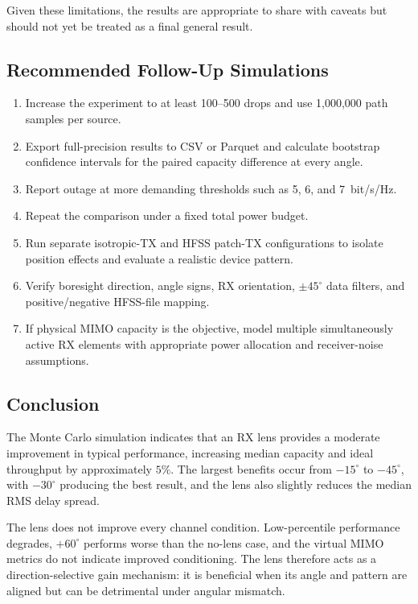 \documentclass[10pt]{article}
\begin{document}
Given these limitations, the results are appropriate to share with caveats
but should not yet be treated as a final general result.

\subsection{Recommended Follow-Up Simulations}

\begin{enumerate}
    \item Increase the experiment to at least 100--500 drops and use
    1,000,000 path samples per source.
    \item Export full-precision results to CSV or Parquet and calculate
    bootstrap confidence intervals for the paired capacity difference at
    every angle.
    \item Report outage at more demanding thresholds such as 5, 6, and
    7~bit/s/Hz.
    \item Repeat the comparison under a fixed total power budget.
    \item Run separate isotropic-TX and HFSS patch-TX configurations to
    isolate position effects and evaluate a realistic device pattern.
    \item Verify boresight direction, angle signs, RX orientation,
    $\pm45^\circ$ data filters, and positive/negative HFSS-file mapping.
    \item If physical MIMO capacity is the objective, model multiple
    simultaneously active RX elements with appropriate power allocation and
    receiver-noise assumptions.
\end{enumerate}

\subsection{Conclusion}

The Monte Carlo simulation indicates that an RX lens provides a moderate
improvement in typical performance, increasing median capacity and ideal
throughput by approximately $5\%$. The largest benefits occur from
$-15^\circ$ to $-45^\circ$, with $-30^\circ$ producing the best result, and
the lens also slightly reduces the median RMS delay spread.

The lens does not improve every channel condition. Low-percentile performance
degrades, $+60^\circ$ performs worse than the no-lens case, and the virtual
MIMO metrics do not indicate improved conditioning. The lens therefore acts
as a direction-selective gain mechanism: it is beneficial when its angle and
pattern are aligned but can be detrimental under angular mismatch.
\end{document}
